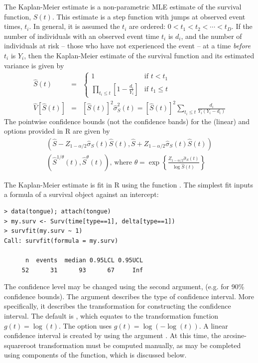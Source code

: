 \documentclass[11pt]{article}
\begin{document}
The Kaplan-Meier estimate is a non-parametric MLE estimate of the survival function, $S(t)$. This estimate is a step function with jumps at observed event times, $t_i$. In general, it is assumed the $t_i$ are ordered: $0 < t_1 < t_2 <  \cdots < t_D$. If the number of individuals with an observed event time $t_i$ is $d_i$, and the number of individuals at risk -- those who have not experienced the event -- at a time \textit{before} $t_i$ is $Y_i$, then the Kaplan-Meier estimate of the survival function and its estimated variance is given by
\begin{eqnarray*}
\hat{S}(t) &=& \left\{\begin{array}{cl}1 & \text{if }t < t_1 \\ \prod_{t_i \leq t}\left[ 1- \frac{d_i}{Y_i} \right] &\text{if }t_1 \leq t \end{array}\right.  \\
\widehat{V}[\hat{S}(t)] &=& \left[ \hat{S}(t) \right]^2 \hat{\sigma}_S^2(t) = \left[ \hat{S}(t) \right]^2 \sum_{t_i \leq t} \frac{d_i}{Y_i(Y_i-d_i)}
\end{eqnarray*}
The pointwise confidence bounds (not the confidence bands) for the  (linear) and  options provided in R are given by
\begin{eqnarray*}
\left( \hat{S} - Z_{1-\alpha/2}\hat{\sigma}_S(t)\hat{S}(t), \hat{S} + Z_{1-\alpha/2}\hat{\sigma}_S(t)\hat{S}(t) \right) \\
\left(\hat{S}^{1/\theta}(t), \hat{S}^\theta(t)\right)\text{, where }\theta = \exp\left\{ \frac{Z_{1-\alpha/2}\hat{\sigma}_S(t)}{\log \hat{S}(t) } \right\}
\end{eqnarray*}

The Kaplan-Meier estimate is fit in R using the function . The simplest fit inputs a formula of a survival object against an intercept:
\begin{verbatim}
> data(tongue); attach(tongue)
> my.surv <- Surv(time[type==1], delta[type==1])
> survfit(my.surv ~ 1)
Call: survfit(formula = my.surv)

      n  events  median 0.95LCL 0.95UCL 
     52      31      93      67     Inf 
\end{verbatim}
The confidence level may be changed using the second argument,  (e.g.  for 90\% confidence bounds). The  argument describes the type of confidence interval. More specifically, it describes the transformation for constructing the confidence interval. The default is , which equates to the transformation function $g(t) = \log(t)$. The  option uses $g(t) = \log(-\log(t))$. A linear confidence interval is created by using the argument . At this time, the arcsine-squareroot transformation must be computed manually, as may be completed using components of the  function, which is discussed below.
\end{document}
